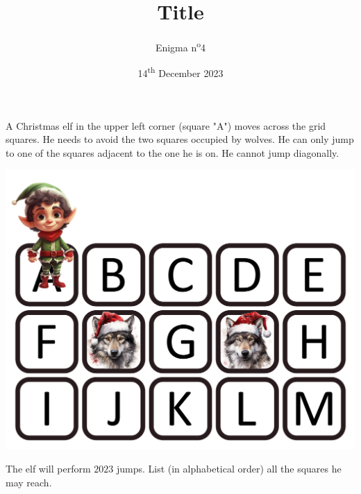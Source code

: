 \documentclass[a4paper, top=10mm]{article}
\title{\textbf{\huge{Title}}}
\author{Enigma n\textsuperscript{o}4}
\date{14\textsuperscript{th} December 2023}
\begin{document}
	\maketitle
	
	A Christmas elf in the upper left corner (square "A") moves across the grid squares.
	He needs to avoid the two squares occupied by wolves.
	He can only jump to one of the squares adjacent to the one he is on.
	He cannot jump diagonally.
	
	\begin{center}
		\includegraphics[width=\linewidth]{04map.png}\\
	\end{center}
	
	The elf will perform $2023$ jumps.
	List (in alphabetical order) all the squares he may reach.
	
\end{document}
